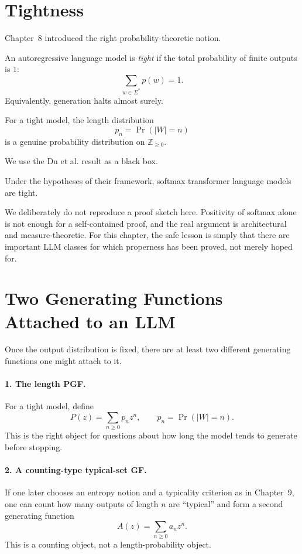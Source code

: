 \section{Tightness}

Chapter~8 introduced the right probability-theoretic notion.

\begin{definition}
An autoregressive language model is \emph{tight} if the total probability of finite outputs is $1$:
\[
  \sum_{w \in \Sigma^*} p(w) = 1.
\]
Equivalently, generation halts almost surely.
\end{definition}

For a tight model, the length distribution
\[
  p_n = \Pr(|W|=n)
\]
is a genuine probability distribution on $\mathbb{Z}_{\ge 0}$.

We use the Du et al.
result as a black box.

\begin{theorem}
Under the hypotheses of their framework, softmax transformer language models are tight.
\end{theorem}

We deliberately do not reproduce a proof sketch here. Positivity of softmax alone is not enough for a self-contained proof, and the real argument is architectural and measure-theoretic. For this chapter, the safe lesson is simply that there are important LLM classes for which properness has been proved, not merely hoped for.

\section{Two Generating Functions Attached to an LLM}

Once the output distribution is fixed, there are at least two different generating functions one might attach to it.

\paragraph{1. The length PGF.}
For a tight model, define
\[
  P(z) = \sum_{n \ge 0} p_n z^n,
  \qquad
  p_n = \Pr(|W|=n).
\]
This is the right object for questions about how long the model tends to generate before stopping.

\paragraph{2. A counting-type typical-set GF.}
If one later chooses an entropy notion and a typicality criterion as in Chapter~9, one can count how many outputs of length $n$ are ``typical'' and form a second generating function
\[
  A(z) = \sum_{n \ge 0} a_n z^n.
\]
This is a counting object, not a length-probability object.


